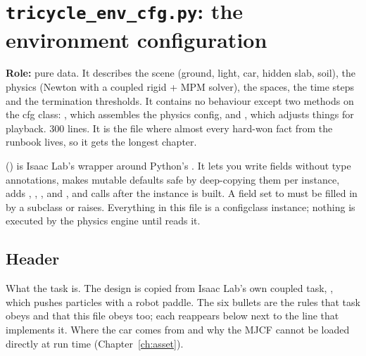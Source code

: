 \chapter{\texttt{tricycle\_env\_cfg.py}: the environment configuration}
\label{ch:env_cfg}

\textbf{Role:} pure data. It describes the scene (ground, light, car, hidden
slab, soil), the physics (Newton with a coupled rigid + MPM solver), the
spaces, the time steps and the termination thresholds. It contains no
behaviour except two methods on the cfg class: , which
assembles the physics config, and , which adjusts things for
playback. 300 lines. It is the file where almost every hard-won fact from the
runbook lives, so it gets the longest chapter.

\begin{isaacbox}{}
 () is
Isaac Lab's wrapper around Python's . It lets you write
fields without type annotations, makes mutable defaults safe by deep-copying
them per instance, adds , , ,  and ,
and calls  after the instance is built. A field set to
 must be filled in by a subclass or  raises.
Everything in this file is a configclass instance; nothing is executed by
the physics engine until  reads it.
\end{isaacbox}

\section{Header}


\begin{explain}
 What the task is.
 The design is copied from Isaac Lab's own coupled task,
  ,
  which pushes particles with a robot paddle. The six bullets are the rules
  that task obeys and that this file obeys too; each reappears below next to
  the line that implements it.
 Where the car comes from and why the MJCF cannot be loaded
  directly at run time (Chapter~\ref{ch:asset}).
\end{explain}

